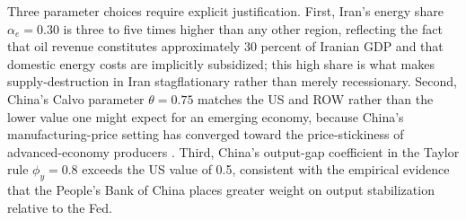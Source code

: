 \documentclass[12pt]{article}
\begin{document}
Three parameter choices require explicit justification. First, Iran's energy share $\alpha_e = 0.30$ is three to five times higher than any other region, reflecting the fact that oil revenue constitutes approximately 30 percent of Iranian GDP and that domestic energy costs are implicitly subsidized; this high share is what makes supply-destruction in Iran stagflationary rather than merely recessionary. Second, China's Calvo parameter $\theta = 0.75$ matches the US and ROW rather than the lower value one might expect for an emerging economy, because China's manufacturing-price setting has converged toward the price-stickiness of advanced-economy producers \citep{gali2015monetary}. Third, China's output-gap coefficient in the Taylor rule $\phi_y = 0.8$ exceeds the US value of 0.5, consistent with the empirical evidence that the People's Bank of China places greater weight on output stabilization relative to the Fed.
\end{document}
